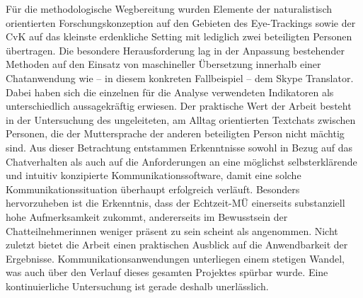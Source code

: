 {Für die methodologische Wegbereitung wurden Elemente der naturalistisch orientierten Forschungskonzeption auf den Gebieten des Eye-Trackings sowie der CvK auf das kleinste erdenkliche Setting mit lediglich zwei beteiligten Personen übertragen. Die besondere Herausforderung lag in der Anpassung bestehender Methoden auf den Einsatz von maschineller Übersetzung innerhalb einer Chatanwendung wie -- in diesem konkreten Fallbeispiel -- dem Skype Translator. Dabei haben sich die einzelnen für die Analyse verwendeten Indikatoren als unterschiedlich aussagekräftig erwiesen.
Der praktische Wert der Arbeit besteht in der Untersuchung des ungeleiteten, am Alltag orientierten Textchats zwischen Personen, die der Muttersprache der anderen beteiligten Person nicht mächtig sind. Aus dieser Betrachtung entstammen Erkenntnisse sowohl in Bezug auf das Chatverhalten als auch auf die Anforderungen an eine möglichst selbsterklärende und intuitiv konzipierte Kommunikationssoftware, damit eine solche Kommunikationssituation überhaupt erfolgreich verläuft. Besonders hervorzuheben ist die Erkenntnis, dass der Echtzeit-MÜ einerseits substanziell hohe Aufmerksamkeit zukommt, andererseits im Bewusstsein der Chatteilnehmer{\textperiodcentered}innen weniger präsent zu sein scheint als angenommen.
Nicht zuletzt bietet die Arbeit einen praktischen Ausblick auf die Anwendbarkeit der Ergebnisse. Kommunikationsanwendungen unterliegen einem stetigen Wandel, was auch über den Verlauf dieses gesamten Projektes spürbar wurde. Eine kontinuierliche Untersuchung ist gerade deshalb unerlässlich.

}
